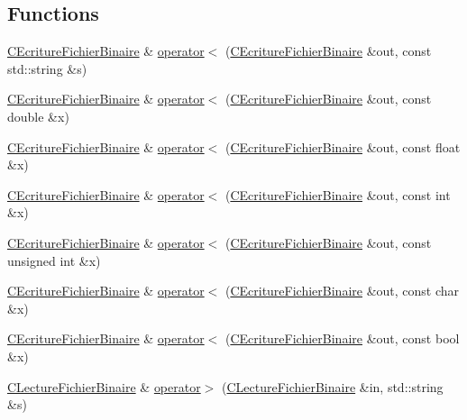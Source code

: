 \subsection*{Functions}
\begin{DoxyCompactItemize}
\item 
\hyperlink{class_c_ecriture_fichier_binaire}{C\+Ecriture\+Fichier\+Binaire} \& \hyperlink{group__utilitaire_ga3eb1e87955cdb70cd0b16f217740326b}{operator$<$} (\hyperlink{class_c_ecriture_fichier_binaire}{C\+Ecriture\+Fichier\+Binaire} \&out, const std\+::string \&s)
\item 
\hyperlink{class_c_ecriture_fichier_binaire}{C\+Ecriture\+Fichier\+Binaire} \& \hyperlink{group__utilitaire_ga04922202c65ecfea992b139fa3ad19ff}{operator$<$} (\hyperlink{class_c_ecriture_fichier_binaire}{C\+Ecriture\+Fichier\+Binaire} \&out, const double \&x)
\item 
\hyperlink{class_c_ecriture_fichier_binaire}{C\+Ecriture\+Fichier\+Binaire} \& \hyperlink{group__utilitaire_ga616de7f95d66959d1a2e3216143180aa}{operator$<$} (\hyperlink{class_c_ecriture_fichier_binaire}{C\+Ecriture\+Fichier\+Binaire} \&out, const float \&x)
\item 
\hyperlink{class_c_ecriture_fichier_binaire}{C\+Ecriture\+Fichier\+Binaire} \& \hyperlink{group__utilitaire_ga1c0af1c4869b15575ea9c9567a377776}{operator$<$} (\hyperlink{class_c_ecriture_fichier_binaire}{C\+Ecriture\+Fichier\+Binaire} \&out, const int \&x)
\item 
\hyperlink{class_c_ecriture_fichier_binaire}{C\+Ecriture\+Fichier\+Binaire} \& \hyperlink{group__utilitaire_gaa4c96e2902dbd2e7fc766683ae7dd3a0}{operator$<$} (\hyperlink{class_c_ecriture_fichier_binaire}{C\+Ecriture\+Fichier\+Binaire} \&out, const unsigned int \&x)
\item 
\hyperlink{class_c_ecriture_fichier_binaire}{C\+Ecriture\+Fichier\+Binaire} \& \hyperlink{group__utilitaire_ga2df50a83cca6bbfec35053d1b3f08a83}{operator$<$} (\hyperlink{class_c_ecriture_fichier_binaire}{C\+Ecriture\+Fichier\+Binaire} \&out, const char \&x)
\item 
\hyperlink{class_c_ecriture_fichier_binaire}{C\+Ecriture\+Fichier\+Binaire} \& \hyperlink{group__utilitaire_ga5e7baf907cb1eec95df25008219c34f7}{operator$<$} (\hyperlink{class_c_ecriture_fichier_binaire}{C\+Ecriture\+Fichier\+Binaire} \&out, const bool \&x)
\item 
\hyperlink{class_c_lecture_fichier_binaire}{C\+Lecture\+Fichier\+Binaire} \& \hyperlink{group__utilitaire_ga810bf15b405f05f3069b97084f61aa95}{operator$>$} (\hyperlink{class_c_lecture_fichier_binaire}{C\+Lecture\+Fichier\+Binaire} \&in, std\+::string \&s)

\end{DoxyCompactItemize}
